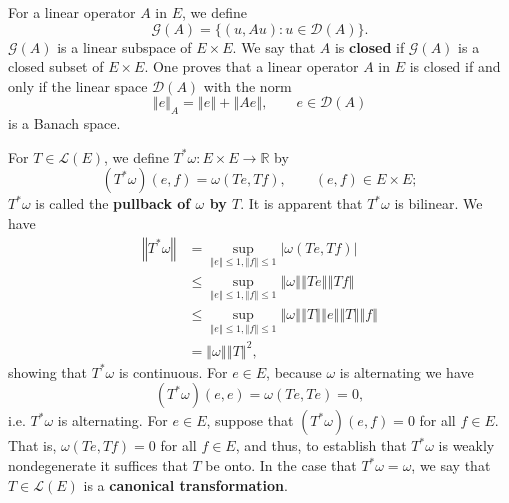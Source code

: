 \documentclass{article}
\newcommand{\norm}[1]{\left\Vert #1 \right\Vert}
\theoremstyle{definition}
\begin{document}
For a linear operator $A$ in $E$, we define 
\[
\mathscr{G}(A) = \{(u,Au): u \in \mathscr{D}(A)\}.
\]
$\mathscr{G}(A)$ is a linear subspace of $E \times E$. We say that
$A$ is \textbf{closed} if $\mathscr{G}(A)$ is a closed subset of $E \times E$. 
One proves that a linear operator $A$ in $E$ is closed if and only if 
the linear space $\mathscr{D}(A)$ with the norm
\[
\norm{e}_A = \norm{e}+\norm{Ae}, \qquad e \in \mathscr{D}(A)
\]
is a Banach space. 

For $T \in \mathscr{L}(E)$, we define $T^*\omega:E \times E \to \mathbb{R}$ by
\[
(T^*\omega)(e,f) = \omega(Te,Tf), \qquad (e,f) \in E \times E;
\]
 $T^*\omega$ is called the \textbf{pullback of $\omega$ by $T$}. It is apparent that $T^*\omega$ is  bilinear.
 We have
 \begin{align*}
 \norm{T^*\omega}&=\sup_{\norm{e} \leq 1, \norm{f} \leq 1}
 |\omega(Te,Tf)|\\
 &\leq \sup_{\norm{e} \leq 1, \norm{f} \leq 1} \norm{\omega} \norm{Te} \norm{Tf}\\
 &\leq \sup_{\norm{e} \leq 1, \norm{f} \leq 1} \norm{\omega} \norm{T} \norm{e}
 \norm{T} \norm{f}\\
 &=\norm{\omega} \norm{T}^2,
 \end{align*}
 showing that $T^*\omega$ is continuous. For $e \in E$, because $\omega$ is alternating we have
 \[
 (T^*\omega)(e,e) = \omega(Te,Te) = 0,
 \]
 i.e. $T^*\omega$ is alternating. 
 For $e \in E$, suppose that $(T^*\omega)(e,f)=0$ for all $f \in E$. That is,
 $\omega(Te,Tf)=0$ for all $f \in E$, and thus, to establish that $T^*\omega$ is weakly nondegenerate it suffices that
 $T$ be onto. In the case that $T^*\omega = \omega$, we say that $T \in \mathscr{L}(E)$ is a \textbf{canonical transformation}.
\end{document}
